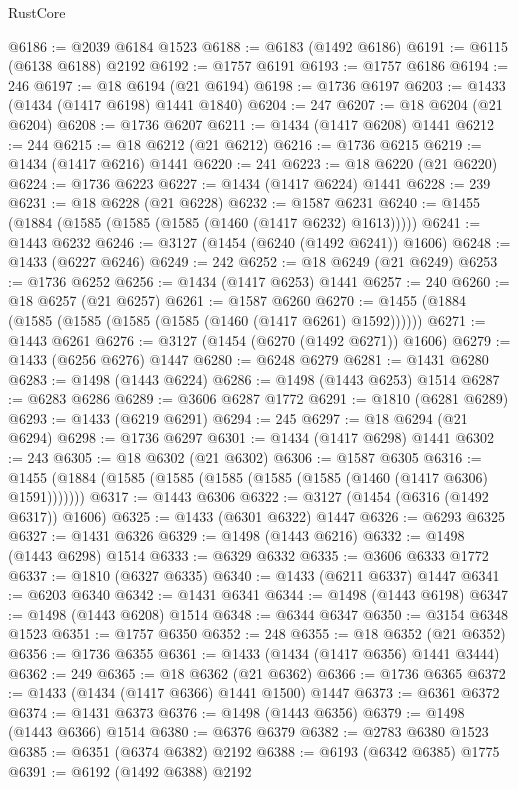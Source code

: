 \begin{lexlean}{RustCore}
\begin{coremodule}
@6186 := @2039 @6184 @1523
@6188 := @6183 (@1492 @6186)
@6191 := @6115 (@6138 @6188) @2192
@6192 := @1757 @6191
@6193 := @1757 @6186
@6194 := 246
@6197 := @18 @6194 (@21 @6194)
@6198 := @1736 @6197
@6203 := @1433 (@1434 (@1417 @6198) @1441 @1840)
@6204 := 247
@6207 := @18 @6204 (@21 @6204)
@6208 := @1736 @6207
@6211 := @1434 (@1417 @6208) @1441
@6212 := 244
@6215 := @18 @6212 (@21 @6212)
@6216 := @1736 @6215
@6219 := @1434 (@1417 @6216) @1441
@6220 := 241
@6223 := @18 @6220 (@21 @6220)
@6224 := @1736 @6223
@6227 := @1434 (@1417 @6224) @1441
@6228 := 239
@6231 := @18 @6228 (@21 @6228)
@6232 := @1587 @6231
@6240 := @1455 (@1884 (@1585 (@1585 (@1585 (@1460 (@1417 @6232) @1613)))))
@6241 := @1443 @6232
@6246 := @3127 (@1454 (@6240 (@1492 @6241)) @1606)
@6248 := @1433 (@6227 @6246)
@6249 := 242
@6252 := @18 @6249 (@21 @6249)
@6253 := @1736 @6252
@6256 := @1434 (@1417 @6253) @1441
@6257 := 240
@6260 := @18 @6257 (@21 @6257)
@6261 := @1587 @6260
@6270 := @1455 (@1884 (@1585 (@1585 (@1585 (@1585 (@1460 (@1417 @6261) @1592))))))
@6271 := @1443 @6261
@6276 := @3127 (@1454 (@6270 (@1492 @6271)) @1606)
@6279 := @1433 (@6256 @6276) @1447
@6280 := @6248 @6279
@6281 := @1431 @6280
@6283 := @1498 (@1443 @6224)
@6286 := @1498 (@1443 @6253) @1514
@6287 := @6283 @6286
@6289 := @3606 @6287 @1772
@6291 := @1810 (@6281 @6289)
@6293 := @1433 (@6219 @6291)
@6294 := 245
@6297 := @18 @6294 (@21 @6294)
@6298 := @1736 @6297
@6301 := @1434 (@1417 @6298) @1441
@6302 := 243
@6305 := @18 @6302 (@21 @6302)
@6306 := @1587 @6305
@6316 := @1455 (@1884 (@1585 (@1585 (@1585 (@1585 (@1585 (@1460 (@1417 @6306) @1591)))))))
@6317 := @1443 @6306
@6322 := @3127 (@1454 (@6316 (@1492 @6317)) @1606)
@6325 := @1433 (@6301 @6322) @1447
@6326 := @6293 @6325
@6327 := @1431 @6326
@6329 := @1498 (@1443 @6216)
@6332 := @1498 (@1443 @6298) @1514
@6333 := @6329 @6332
@6335 := @3606 @6333 @1772
@6337 := @1810 (@6327 @6335)
@6340 := @1433 (@6211 @6337) @1447
@6341 := @6203 @6340
@6342 := @1431 @6341
@6344 := @1498 (@1443 @6198)
@6347 := @1498 (@1443 @6208) @1514
@6348 := @6344 @6347
@6350 := @3154 @6348 @1523
@6351 := @1757 @6350
@6352 := 248
@6355 := @18 @6352 (@21 @6352)
@6356 := @1736 @6355
@6361 := @1433 (@1434 (@1417 @6356) @1441 @3444)
@6362 := 249
@6365 := @18 @6362 (@21 @6362)
@6366 := @1736 @6365
@6372 := @1433 (@1434 (@1417 @6366) @1441 @1500) @1447
@6373 := @6361 @6372
@6374 := @1431 @6373
@6376 := @1498 (@1443 @6356)
@6379 := @1498 (@1443 @6366) @1514
@6380 := @6376 @6379
@6382 := @2783 @6380 @1523
@6385 := @6351 (@6374 @6382) @2192
@6388 := @6193 (@6342 @6385) @1775
@6391 := @6192 (@1492 @6388) @2192

\end{coremodule}
\end{lexlean}

